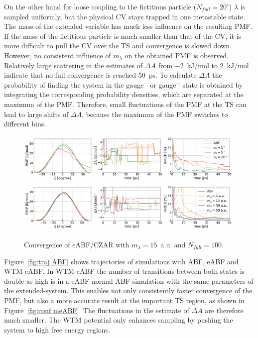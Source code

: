 On the other hand for loose coupling to the fictitious particle ($N_{full}=20^\circ$) $\lambda$ is sampled uniformly, but the physical CV stays trapped in one metastable state.
The mass of the extended variable has much less influence on the resulting PMF.
If the mass of the fictitious particle is much smaller than that of the CV, it is more difficult to pull the CV over the TS and convergence is slowed down.
However, no consistent influence of $m_\lambda$ on the obtained PMF is observed.
Relatively large scattering in the estimates of $\Delta A$ from $-2$~kJ/mol to $2$~kJ/mol indicate that no full convergence is reached 50~ps.
To calculate $\Delta A$ the probability of finding the system in the gauge$^-$ or gauge$^+$ state is obtained by integrating the corresponding probability densities, which are separated at the maximum of the PMF.
Therefore, small fluctuations of the PMF at the TS can lead to large shifts of $\Delta A$, because the maximum of the PMF switches to different bins.
\begin{figure}[H]
  \centering
    \includegraphics[width=0.99\textwidth]{bilder/benchmark/eABF_benchmark_sigma}
    \includegraphics[width=0.99\textwidth]{bilder/benchmark/eABF_benchmark_mass}
   \caption{Convergence of eABF/CZAR with $m_\lambda=15$~a.u. and $N_{full}=100$.}
   \label{fig:conf eABF}
\end{figure}
Figure~\ref{fig:traj ABF} shows trajectories of simulations with ABF, eABF and WTM-eABF.
In WTM-eABF the number of transitions between both states is double as high is in a eABF normal ABF simulation with the same parameters of the extended-system.
This enables not only consistently faster convergence of the PMF, but also a more accurate result at the important TS region, as shown in Figure~\ref{fig:conf meABF}.
The fluctuations in the estimate of $\Delta A$ are therefore much smaller.
The WTM potential only enhances sampling by pushing the system to high free energy regions.
